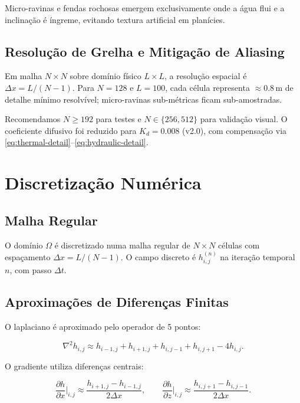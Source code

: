 \documentclass[11pt,a4paper]{article}
\begin{document}
Micro-ravinas e fendas rochosas emergem exclusivamente onde a água flui e a inclinação
é íngreme, evitando textura artificial em planícies.

\subsection{Resolução de Grelha e Mitigação de Aliasing}

Em malha $N \times N$ sobre domínio físico $L \times L$, a resolução espacial é
$\Delta x = L/(N-1)$. Para $N=128$ e $L=100$, cada célula representa $\approx 0.8$\,m
de detalhe mínimo resolvível; micro-ravinas sub-métricas ficam sub-amostradas.

Recomendamos $N \geq 192$ para testes e $N \in \{256, 512\}$ para validação visual.
O coeficiente difusivo foi reduzido para $K_d = 0.008$ (v2.0), com compensação via
\eqref{eq:thermal-detail}--\eqref{eq:hydraulic-detail}.

\section{Discretização Numérica}

\subsection{Malha Regular}

O domínio $\Omega$ é discretizado numa malha regular de $N \times N$ células com espaçamento
$\Delta x = L / (N-1)$. O campo discreto é $h_{i,j}^{(n)}$ na iteração temporal $n$,
com passo $\Delta t$.

\subsection{Aproximações de Diferenças Finitas}

O laplaciano é aproximado pelo operador de 5 pontos:

\begin{equation}
  \nabla^2 h_{i,j} \approx h_{i-1,j} + h_{i+1,j} + h_{i,j-1} + h_{i,j+1} - 4h_{i,j}.
  \label{eq:laplacian}
\end{equation}

O gradiente utiliza diferenças centrais:

\begin{equation}
  \frac{\partial h}{\partial x}\bigg|_{i,j} \approx \frac{h_{i+1,j} - h_{i-1,j}}{2\Delta x},
  \qquad
  \frac{\partial h}{\partial z}\bigg|_{i,j} \approx \frac{h_{i,j+1} - h_{i,j-1}}{2\Delta x}.
  \label{eq:gradient}
\end{equation}
\end{document}
